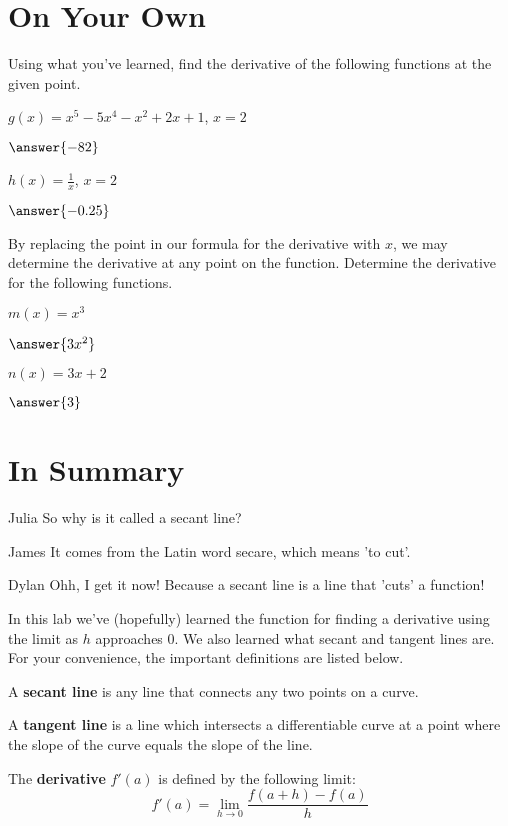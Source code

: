\documentclass{ximera}
\begin{document}
\section{On Your Own}
Using what you've learned, find the derivative of the following functions at the given point.
\setcounter{problem}{0}
\begin{question}
$g(x) = x^5-5x^4-x^2+2x+1$, $x=2$

$\answer{-82}$

$h(x) = \frac{1}{x}$, $x=2$

$\answer{-0.25}$
\end{question}

By replacing the point in our formula for the derivative with $x$, we may determine the derivative at any point on the function. Determine the derivative for the following functions.
\begin{question}
$m(x) = x^3$

$\answer{3x^2}$

$n(x) = 3x+2$

$\answer{3}$
\end{question}


\section{In Summary}
\begin{dialogue}
\item[Julia] So why is it called a secant line?
\item[James] It comes from the Latin word secare, which means 'to cut'.
\item[Dylan] Ohh, I get it now! Because a secant line is a line that 'cuts' a function!
\end{dialogue}
In this lab we've (hopefully) learned the function for finding a derivative using the limit as $h$ approaches 0. We also learned what secant and tangent lines are. For your convenience, the important definitions are listed below.
\begin{definition}
 A \textbf{secant line} is any line that connects any two points on a curve.
\end{definition}
\begin{definition}
A \textbf{tangent line} is a line which intersects a differentiable curve at a point where the slope of the curve equals the slope of the line.
\end{definition}
\begin{definition}
The \textbf{derivative} $f'(a)$ is defined by the following limit:
$$f'(a)=\displaystyle \lim_{h\rightarrow 0} \frac{f(a+h)-f(a)}{h}$$
\end{definition}
\end{document}
